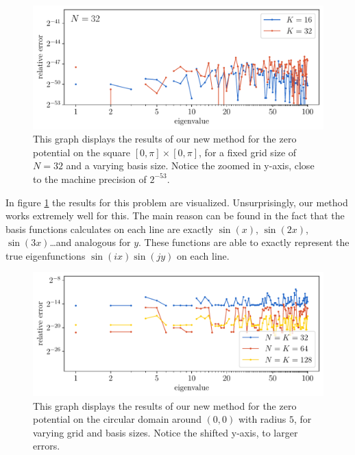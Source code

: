 \begin{figure}
    \begin{center}
        \includegraphics[width=\textwidth]{img/chapter4/nm_test_zero_rectangle.pdf}
    \end{center}
    \caption{This graph displays the results of our new method for the zero potential on the square $[0, \pi] \times [0, \pi]$, for a fixed grid size of $N = 32$ and a varying basis size. Notice the zoomed in y-axis, close to the machine precision of $2^{-53}$.}
    \label{fig:c4_nm_zero_test_rectangle}
\end{figure}

In figure \ref{fig:c4_nm_zero_test_rectangle} the results for this problem are visualized. Unsurprisingly, our method works extremely well for this. The main reason can be found in the fact that the basis functions \matslise calculates on each line are exactly $\sin(x)$, $\sin(2x)$, $\sin(3x)$\dots and analogous for $y$. These functions are able to exactly represent the true eigenfunctions $\sin(i x)\sin(j y)$ on each line.

\begin{figure}
    \begin{center}
        \includegraphics[width=\textwidth]{img/chapter4/nm_test_zero_disc.pdf}
    \end{center}
    \caption{This graph displays the results of our new method for the zero potential on the circular domain around $(0, 0)$ with radius $5$, for varying grid and basis sizes. Notice the shifted y-axis, to larger errors.}
    \label{fig:c4_nm_zero_test_disc}
\end{figure}

